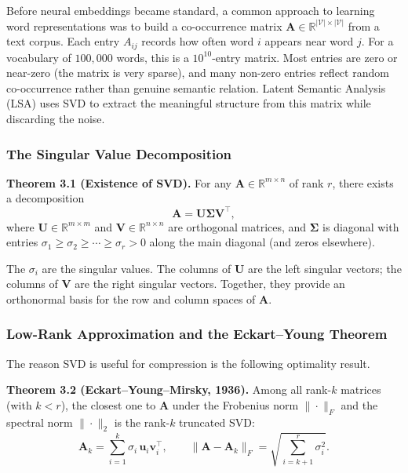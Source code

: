 \documentclass[12pt,a4paper]{article}
\begin{document}
Before neural embeddings became standard, a common approach to learning word representations
was to build a co-occurrence matrix $\mathbf{A} \in \mathbb{R}^{|\mathcal{V}| \times |\mathcal{V}|}$
from a text corpus. Each entry $A_{ij}$ records how often word $i$ appears near word $j$.
For a vocabulary of $100{,}000$ words, this is a $10^{10}$-entry matrix. Most entries are
zero or near-zero (the matrix is very sparse), and many non-zero entries reflect random
co-occurrence rather than genuine semantic relation. Latent Semantic Analysis (LSA) uses
SVD to extract the meaningful structure from this matrix while discarding the noise.

\subsubsection{The Singular Value Decomposition}

\textbf{Theorem 3.1 (Existence of SVD).} For any $\mathbf{A} \in \mathbb{R}^{m \times n}$
of rank $r$, there exists a decomposition
\begin{equation}
    \mathbf{A} = \mathbf{U}\boldsymbol{\Sigma}\mathbf{V}^\top,
\end{equation}
where $\mathbf{U} \in \mathbb{R}^{m \times m}$ and $\mathbf{V} \in \mathbb{R}^{n \times n}$
are orthogonal matrices, and $\boldsymbol{\Sigma}$ is diagonal with entries
$\sigma_1 \geq \sigma_2 \geq \cdots \geq \sigma_r > 0$ along the main diagonal (and zeros
elsewhere).

The $\sigma_i$ are the singular values. The columns of $\mathbf{U}$ are the left singular
vectors; the columns of $\mathbf{V}$ are the right singular vectors. Together, they provide
an orthonormal basis for the row and column spaces of $\mathbf{A}$.

\subsubsection{Low-Rank Approximation and the Eckart--Young Theorem}

The reason SVD is useful for compression is the following optimality result.

\textbf{Theorem 3.2 (Eckart--Young--Mirsky, 1936).} Among all rank-$k$ matrices (with
$k < r$), the closest one to $\mathbf{A}$ under the Frobenius norm $\|\cdot\|_F$ and the
spectral norm $\|\cdot\|_2$ is the rank-$k$ truncated SVD:
\begin{equation}
    \mathbf{A}_k = \sum_{i=1}^{k} \sigma_i\, \mathbf{u}_i\mathbf{v}_i^\top,
    \qquad
    \|\mathbf{A} - \mathbf{A}_k\|_F = \sqrt{\sum_{i=k+1}^{r} \sigma_i^2}.
\end{equation}
\end{document}
